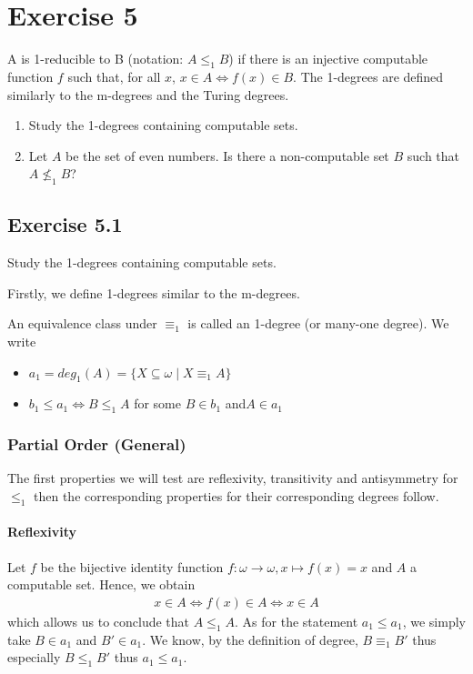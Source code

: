 \documentclass[11pt,a4paper]{article}
\begin{document}
\section*{Exercise 5}

A is 1-reducible to B (notation: $A \leq_1 B$) if there is an injective computable function $f$ such that, for all $x$,
$x \in A \iff f(x) \in B$.
The 1-degrees are defined similarly to the m-degrees and the Turing degrees.
\begin{enumerate}
\item Study the 1-degrees containing computable sets.
\item Let $A$ be the set of even numbers. Is there a non-computable set $B$ such that $A \nleq_1 B$?
\end{enumerate}

\subsection*{Exercise 5.1}
Study the 1-degrees containing computable sets.

Firstly, we define 1-degrees similar to the m-degrees.

An equivalence class under $\equiv_1$ is called an 1-degree (or many-one degree). We write 
\begin{itemize}
\item $a_1 = deg_1(A) = \{X \subseteq \omega \mid X \equiv_1 A\}$
\item $b_1 \leq a_1 \iff B \leq_1 A$ for some $B \in b_1$ and$A \in a_1$
\end{itemize}

\subsubsection*{Partial Order (General)}

The first properties we will test are reflexivity, transitivity and antisymmetry for $\leq_1$ then the corresponding properties for their corresponding degrees follow.
\paragraph{Reflexivity} 
Let $f$ be the bijective identity function $f: \omega \to \omega, x \mapsto f(x)=x$ and $A$ a computable set. Hence, we obtain 
\begin{equation*}
\begin{split}
x \in A  \iff f(x) \in A  \iff x \in A 
\end{split}
\end{equation*}
which allows us to conclude that $A \leq_1 A$.
As for the statement $a_1 \leq a_1$, we simply take $B \in a_1$ and $B' \in a_1$.
We know, by the definition of degree, $B \equiv_1 B'$ thus especially $B \leq_1 B'$ thus $a_1 \leq a_1$.
\end{document}

